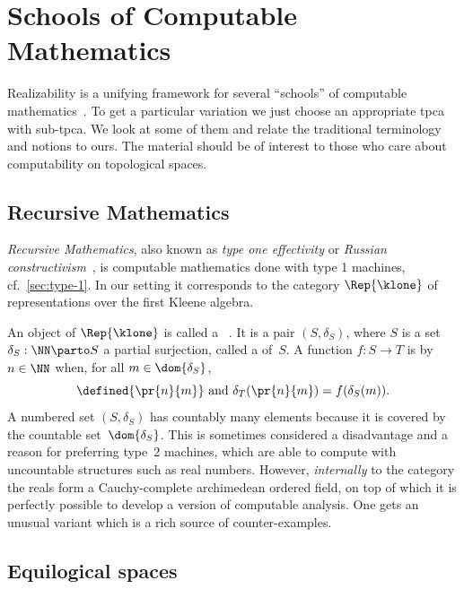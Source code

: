 \section{Schools of Computable Mathematics}
\label{sec:schools}

Realizability is a unifying framework for several ``schools'' of computable mathematics~.
To get a particular variation we just choose an appropriate tpca with sub-tpca. We look at some of them and relate the traditional terminology and notions to ours. The material should be of interest to those who care about computability on topological spaces.

\subsection{Recursive Mathematics}
\label{sec:recursive-math}

\emph{Recursive Mathematics}, also known as \emph{type
  one effectivity} or \emph{Russian constructivism}~, is
computable mathematics done with type 1 machines, cf.\
\cref{sec:type-1}. In our setting it corresponds to the
category $\Rep{\klone}$ of representations over the first Kleene algebra.

An object of $\Rep{\klone}$ is called a ~. It is a pair
$(S, \delta_S)$, where $S$ is a set $\delta_S : \NN \parto S$ a
partial surjection, called a  of~$S$. A function $f :
S \to T$ is \defemph{realized} by $n \in \NN$ when, for all $m \in
\dom{\delta_S}$,
%
\begin{equation*}
  \text{$\defined{\pr{n}{m}}$ and $\delta_T(\pr{n}{m}) = f(\delta_S(m))$.}
\end{equation*}
%
A numbered set $(S, \delta_S)$ has countably many elements because it is covered by the
countable set~$\dom{\delta_S}$. This is sometimes considered a disadvantage and a reason
for preferring type~2 machines, which are able to compute with uncountable structures such
as real numbers. However, \emph{internally} to the category the reals form a
Cauchy-complete archimedean ordered field, on top of which it is perfectly possible to
develop a version of computable analysis. One gets an unusual variant which is a rich source
of counter-examples.

\subsection{Equilogical spaces}
\label{sec:equilogical-spaces}

